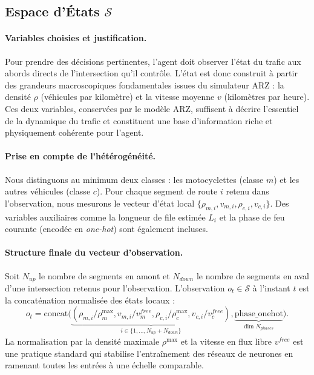 \subsection{Espace d'États $\mathcal{S}$}
\label{subsec:espace_etats}

\paragraph{Variables choisies et justification.}
Pour prendre des décisions pertinentes, l'agent doit observer l'état du trafic aux abords directs de l'intersection qu'il contrôle. L'état est donc construit à partir des grandeurs macroscopiques fondamentales issues du simulateur ARZ : la densité $\rho$ (véhicules par kilomètre) et la vitesse moyenne $v$ (kilomètres par heure). Ces deux variables, conservées par le modèle ARZ, suffisent à décrire l'essentiel de la dynamique du trafic et constituent une base d'information riche et physiquement cohérente pour l'agent.

\paragraph{Prise en compte de l'hétérogénéité.}
Nous distinguons au minimum deux classes : les motocyclettes (classe $m$) et les autres véhicules (classe $c$). Pour chaque segment de route $i$ retenu dans l'observation, nous mesurons le vecteur d'état local $\{\rho_{m,i}, v_{m,i}, \rho_{c,i}, v_{c,i}\}$. Des variables auxiliaires comme la longueur de file estimée $L_i$ et la phase de feu courante (encodée en \textit{one-hot}) sont également incluses.

\paragraph{Structure finale du vecteur d'observation.}
Soit $N_{up}$ le nombre de segments en amont et $N_{down}$ le nombre de segments en aval d'une intersection retenus pour l'observation. L'observation $o_t \in \mathcal{S}$ à l'instant $t$ est la concaténation normalisée des états locaux :
\begin{equation}
o_t = \mathrm{concat}\big( \underbrace{(\rho_{m,i}/\rho^{\max}_m, v_{m,i}/v^{free}_m, \rho_{c,i}/\rho^{\max}_c, v_{c,i}/v^{free}_c)}_{i \in \{1, ..., N_{up}+N_{down}\}}, \underbrace{\text{phase\_onehot}}_{\text{dim } N_{phases}} \big).
\end{equation}
La normalisation par la densité maximale $\rho^{\max}$ et la vitesse en flux libre $v^{free}$ est une pratique standard qui stabilise l'entraînement des réseaux de neurones en ramenant toutes les entrées à une échelle comparable.

